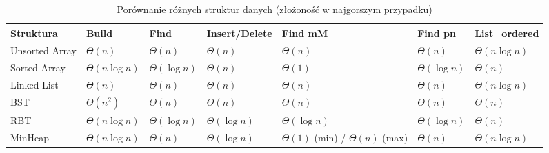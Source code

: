 \documentclass[landscape,a4paper]{article}
\begin{document}
\begin{table}[h!]
\centering
\begin{tabular}{|l|l|l|l|l|l|l|}
\hline
\textbf{Struktura} & \textbf{Build} & \textbf{Find} & \textbf{Insert/Delete} & \textbf{Find mM} & \textbf{Find pn} & \textbf{List\_ordered} \\ \hline
Unsorted Array & $\Theta(n)$ & $\Theta(n)$ & $\Theta(n)$ & $\Theta(n)$ & $\Theta(n)$ & $\Theta(n\log n) $ \\ \hline
Sorted Array & $\Theta(n\log n)$ & $\Theta(\log n)$ & $\Theta(n)$ & $\Theta(1)$ & $\Theta(\log n)$ & $\Theta(n)$ \\ \hline
Linked List & $\Theta(n)$ & $\Theta(n)$ & $\Theta(n)$ & $\Theta(n)$ & $\Theta(n)$ & $\Theta(n\log n)$ \\ \hline
BST & $\Theta(n^2)$ & $\Theta(n)$ & $\Theta(n)$ & $\Theta(n)$ & $\Theta(n)$ & $\Theta(n)$ \\ \hline
RBT & $\Theta(n \log n)$ & $\Theta(\log n)$ & $\Theta(\log n)$ & $\Theta(\log n)$ & $\Theta(\log n)$ & $\Theta(n)$ \\ \hline
MinHeap & $\Theta(n\log n)$ & $\Theta(n)$ & $\Theta(\log n)$ & $\Theta(1)$ (min) / $\Theta(n)$ (max) & $\Theta(n)$ & $\Theta(n \log n)$ \\ \hline
\end{tabular}
\caption{Porównanie różnych struktur danych (złożoność w najgorszym przypadku)}
\label{tab:structure_comparison_worst_case}
\end{table}
\end{document}
